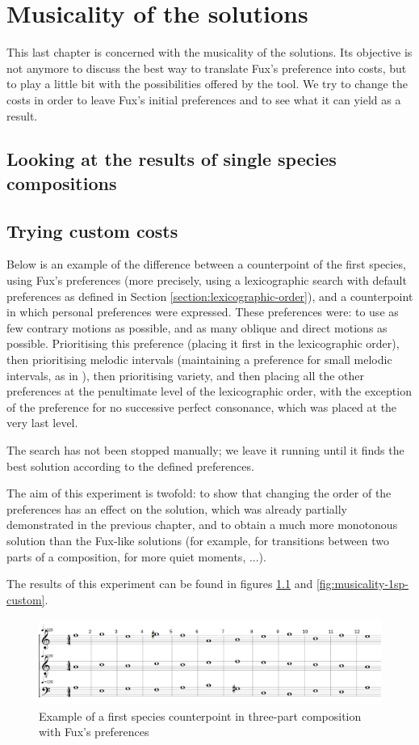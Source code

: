 \chapter{Musicality of the solutions}
This last chapter is concerned with the musicality of the solutions. Its objective is not anymore to discuss the best way to translate Fux's preference into costs, but to play a little bit with the possibilities offered by the tool. We try to change the costs in order to leave Fux's initial preferences and to see what it can yield as a result.

\section{Looking at the results of single species compositions}

\section{Trying custom costs}
Below is an example of the difference between a counterpoint of the first species, using Fux's preferences (more precisely, using a lexicographic search with default preferences as defined in Section \ref{section:lexicographic-order}), and a counterpoint in which personal preferences were expressed. These preferences were: to use as few contrary motions as possible, and as many oblique and direct motions as possible. Prioritising this preference (placing it first in the lexicographic order), then prioritising melodic intervals (maintaining a preference for small melodic intervals, as in \gap), then prioritising variety, and then placing all the other preferences at the penultimate level of the lexicographic order, with the exception of the preference for no successive perfect consonance, which was placed at the very last level.

The search has not been stopped manually; we leave it running until it finds the best solution according to the defined preferences.

The aim of this experiment is twofold: to show that changing the order of the preferences has an effect on the solution, which was already partially demonstrated in the previous chapter, and to obtain a much more monotonous solution than the Fux-like solutions (for example, for transitions between two parts of a composition, for more quiet moments, ...).

The results of this experiment can be found in figures \ref{fig:musicality-1sp-fux} and \ref{fig:musicality-1sp-custom}.
\begin{figure}[h]
    \centering
    \includegraphics[width=1\textwidth]{Images/Musicality/musicality-1sp-fux-pref.png}
    \caption{Example of a first species counterpoint in three-part composition with Fux's preferences}
    \label{fig:musicality-1sp-fux}
\end{figure}

